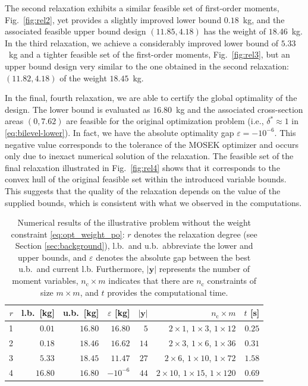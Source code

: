 \documentclass[final,onefignum,onetabnum]{siamart220329}
\begin{document}
The second relaxation exhibits a similar feasible set of first-order moments, Fig.~\ref{fig:rel2}, yet provides a slightly improved lower bound $0.18$~kg, and the associated feasible upper bound design $(11.85, 4.18)$ has the weight of $18.46$~kg. In the third relaxation, we achieve a considerably improved lower bound of $5.33$~kg and a tighter feasible set of the first-order moments, Fig.~\ref{fig:rel3}, but an upper bound design very similar to the one obtained in the second relaxation: $(11.82, 4.18)$ of the weight $18.45$~kg. 

In the final, fourth relaxation, we are able to certify the global optimality of the design. The lower bound is evaluated as $16.80$~kg and the associated cross-section areas $(0, 7.62)$ are feasible for the original optimization problem (i.e., $\delta^*\approx1$ in \eqref{eq:bilevel-lower}). In fact, we have the absolute optimality gap $\varepsilon=-10^{-6}${. This negative value corresponds to the tolerance of the MOSEK optimizer and occurs only due to inexact numerical solution of the relaxation}. The feasible set of the final relaxation illustrated in Fig.~\ref{fig:rel4} shows that it corresponds to the convex hull of the original feasible set within the introduced variable bounds. This suggests that the quality of the relaxation depends on the value of the supplied bounds, which is consistent with what we observed in the computations.

\begin{table}[!htbp]
    \centering
    \begin{tabular}{rrrrrrr}
         $r$ & l.b.\ [kg] & u.b.\ [kg] & $\varepsilon$ [kg] & $\lvert \mathbf{y}\rvert$ & $n_\mathrm{c} \times m$  & $t$ [s]\\ \hline
         1 & $0.01$ & $16.80$ & $16.80$ & $5$ & $2\times1$, $1\times3$, $1\times12$ & $0.25$\\
         2 & $0.18$ & $18.46$ & $16.62$ & $14$ & $2\times3$, $1\times6$, $1\times36$ & $0.31$\\
         3 & $5.33$ & $18.45$ & $11.47$ & $27$ & $2\times6$, $1\times10$, $1\times72$ & $1.58$\\
         4 & $16.80$ & $16.80$ & $-10^{-6}$ & $44$ & $2\times10$, $1\times15$, $1\times120$ & $0.69$
    \end{tabular}
    \caption{Numerical results of the illustrative problem without the weight constraint \eqref{eq:opt_weight_po}: $r$ denotes the relaxation degree {(see Section \ref{sec:background})}, l.b.\ and u.b.\ abbreviate the lower and upper bounds, and $\varepsilon$ denotes the absolute gap between the best u.b.\ and current l.b. Furthermore, $\lvert\mathbf{y}\rvert$ represents the number of moment variables, $n_\mathrm{c}\times m$ indicates that there are $n_\mathrm{c}$ constraints of size $m\times m$, and $t$ provides the computational time.}
    \label{tab:illustrative}
\end{table}
\end{document}
